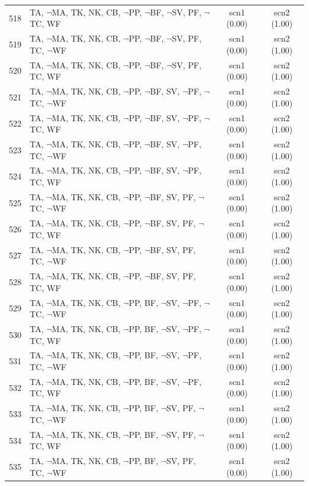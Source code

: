 \documentclass[12pt]{article}
\begin{document}
\begin{longtable}{|l|l|c|c|}
518 & TA, $\neg$MA, TK, NK, CB, $\neg$PP, $\neg$BF, $\neg$SV, PF, $\neg$TC, WF & scn1 (0.00) & scn2 (1.00)\\
519 & TA, $\neg$MA, TK, NK, CB, $\neg$PP, $\neg$BF, $\neg$SV, PF, TC, $\neg$WF & scn1 (0.00) & scn2 (1.00)\\
520 & TA, $\neg$MA, TK, NK, CB, $\neg$PP, $\neg$BF, $\neg$SV, PF, TC, WF & scn1 (0.00) & scn2 (1.00)\\
521 & TA, $\neg$MA, TK, NK, CB, $\neg$PP, $\neg$BF, SV, $\neg$PF, $\neg$TC, $\neg$WF & scn1 (0.00) & scn2 (1.00)\\
522 & TA, $\neg$MA, TK, NK, CB, $\neg$PP, $\neg$BF, SV, $\neg$PF, $\neg$TC, WF & scn1 (0.00) & scn2 (1.00)\\
523 & TA, $\neg$MA, TK, NK, CB, $\neg$PP, $\neg$BF, SV, $\neg$PF, TC, $\neg$WF & scn1 (0.00) & scn2 (1.00)\\
524 & TA, $\neg$MA, TK, NK, CB, $\neg$PP, $\neg$BF, SV, $\neg$PF, TC, WF & scn1 (0.00) & scn2 (1.00)\\
525 & TA, $\neg$MA, TK, NK, CB, $\neg$PP, $\neg$BF, SV, PF, $\neg$TC, $\neg$WF & scn1 (0.00) & scn2 (1.00)\\
526 & TA, $\neg$MA, TK, NK, CB, $\neg$PP, $\neg$BF, SV, PF, $\neg$TC, WF & scn1 (0.00) & scn2 (1.00)\\
527 & TA, $\neg$MA, TK, NK, CB, $\neg$PP, $\neg$BF, SV, PF, TC, $\neg$WF & scn1 (0.00) & scn2 (1.00)\\
528 & TA, $\neg$MA, TK, NK, CB, $\neg$PP, $\neg$BF, SV, PF, TC, WF & scn1 (0.00) & scn2 (1.00)\\
529 & TA, $\neg$MA, TK, NK, CB, $\neg$PP, BF, $\neg$SV, $\neg$PF, $\neg$TC, $\neg$WF & scn1 (0.00) & scn2 (1.00)\\
530 & TA, $\neg$MA, TK, NK, CB, $\neg$PP, BF, $\neg$SV, $\neg$PF, $\neg$TC, WF & scn1 (0.00) & scn2 (1.00)\\
531 & TA, $\neg$MA, TK, NK, CB, $\neg$PP, BF, $\neg$SV, $\neg$PF, TC, $\neg$WF & scn1 (0.00) & scn2 (1.00)\\
532 & TA, $\neg$MA, TK, NK, CB, $\neg$PP, BF, $\neg$SV, $\neg$PF, TC, WF & scn1 (0.00) & scn2 (1.00)\\
533 & TA, $\neg$MA, TK, NK, CB, $\neg$PP, BF, $\neg$SV, PF, $\neg$TC, $\neg$WF & scn1 (0.00) & scn2 (1.00)\\
534 & TA, $\neg$MA, TK, NK, CB, $\neg$PP, BF, $\neg$SV, PF, $\neg$TC, WF & scn1 (0.00) & scn2 (1.00)\\
535 & TA, $\neg$MA, TK, NK, CB, $\neg$PP, BF, $\neg$SV, PF, TC, $\neg$WF & scn1 (0.00) & scn2 (1.00)\\

\end{longtable}
\end{document}
